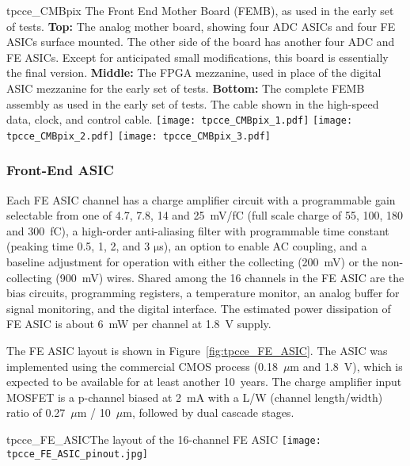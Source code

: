 \begin{cdrfigure}{tpcce_CMBpix}
{The Front End Mother Board (FEMB), as used in the early set of tests.
  {\bf Top:} The analog mother board, showing four ADC ASICs and four FE ASICs surface mounted.
  The other side of the board has another four ADC and FE ASICs.
  Except for anticipated small modifications, this board is essentially the final version.
  {\bf Middle:} The FPGA mezzanine, used in place of the digital ASIC mezzanine for the early set of tests.
  {\bf Bottom:} The complete FEMB assembly as used in the early set of tests.
  The cable shown in the high-speed data, clock, and control cable.}
\texttt{[image: tpcce\_CMBpix\_1.pdf]}
\texttt{[image: tpcce\_CMBpix\_2.pdf]}
\texttt{[image: tpcce\_CMBpix\_3.pdf]}
\end{cdrfigure}

\subsubsection{Front-End ASIC}
 
Each FE ASIC channel has a charge amplifier circuit with a programmable gain selectable from one of 4.7, 7.8, 14 and 25~mV/fC
(full scale charge of 55, 100, 180 and 300~fC),
a high-order anti-aliasing filter with programmable time
constant (peaking time 0.5, 1, 2, and 3 $\mathrm{\mu}$s),
an option to enable AC coupling,
and a baseline adjustment for operation with either the collecting (200~mV) or the non-collecting (900~mV) wires.
Shared among the 16 channels in the FE ASIC are the bias circuits, programming registers,
a temperature monitor, an analog buffer for signal monitoring, and the digital interface.
The estimated power dissipation of FE ASIC is about 6~mW per channel at 1.8~V supply.

The FE ASIC layout is shown in Figure~\ref{fig:tpcce_FE_ASIC}.
The ASIC was implemented using the commercial CMOS process (0.18~$\mu$m and 1.8~V), which 
is expected to be available for at least another 10~years. 
The charge amplifier input MOSFET is a p-channel biased at 2~mA with a L/W (channel length/width) ratio
of 0.27~$\mu$m / 10~$\mu$m, followed by dual cascade stages.

\begin{cdrfigure}{tpcce_FE_ASIC}{The layout of the 16-channel FE ASIC}
\texttt{[image: tpcce\_FE\_ASIC\_pinout.jpg]}
\end{cdrfigure}

